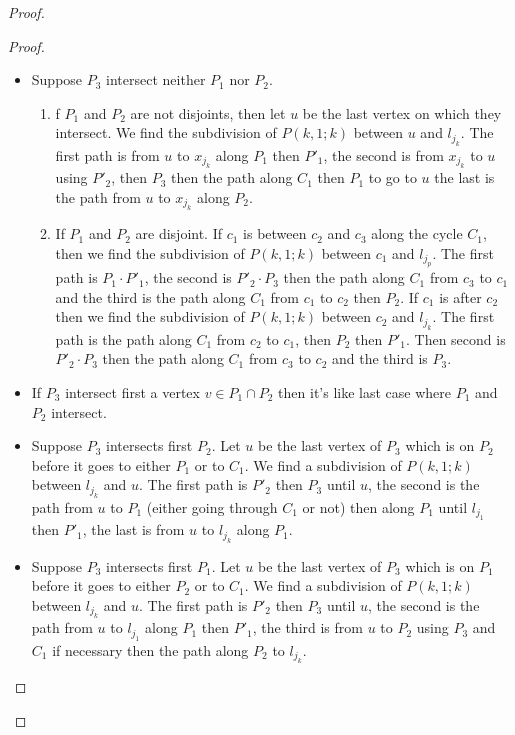 \documentclass[10pt]{article}
\theoremstyle{plain}
\theoremstyle{definition}
\theoremstyle{remark}
\begin{document}
\begin{proof}
\begin{proof}
\begin{itemize}
	\item Suppose $P_3$ intersect neither $P_1$ nor $P_2$.
	\begin{enumerate}
		\item f $P_1$ and $P_2 $ are not disjoints, 
		then let $u$ be the last vertex on which they intersect. We find the subdivision of $P(k,1;k)$ between $u$ and $l_{j_k}$. 
		The first path is from $u$ to $x_{j_k}$ along $P_1$ then $P'_1$, the second is from $x_{j_k}$ to $u$ using $P'_2$, then $P_3$ then the path along $C_1$ 
		then $P_1$ to go to $u$ the last is the path from $u$ to $x_{j_k}$ along $P_2$.
		\item 	If $P_1$ and $P_2$ are disjoint. If $c_1$ is between $c_2$ and $c_3$ along the cycle $C_1$, then we find the subdivision of $P(k,1;k)$
		between $c_1$ and $l_{j_p}$. The first path is $P_1 \cdot P'_1$, the second is $P'_2 \cdot P_3$ 
		then the path along $C_1$ from $c_3$ to $c_1$ and the third
	is the path along $C_1$ from $c_1$ to $c_2$ then $P_2$. If $c_1$ is after $c_2$ then we find the subdivision of $P(k,1;k)$ between $c_2$ and 
	$l_{j_k} $. The first path is the path along $C_1$ from $c_2$ to $c_1$, then $P_2$ then $P'_1$. Then second is $P'_2 \cdot P_3$ then the path along $C_1$ from
	$c_3$ to $c_2$ and the third is $P_3$. 
\end{enumerate}
	\item If $P_3$ intersect first a vertex $v \in P_1 \cap P_2$ then it's like last case where $P_1$ and $P_2$ intersect.
	\item Suppose $P_3$ intersects first $P_2$. Let $u$ be the last vertex of $P_3$ which is on $P_2$ before it goes to either $P_1$ or to $C_1$.
	We find a subdivision of $P(k,1;k)$ between $l_{j_k}$ and $u$. The first path is $P'_2$ then $P_3$ until $u$, the second is the path from $u$ to $P_1$ (either going
	through $C_1$ or not) then along $P_1$ until $l_{j_1}$ then $P'_1$, the last is from $u$ to $l_{j_k}$ along $P_1$.
	\item Suppose $P_3$ intersects first $P_1$. Let $u$ be the last vertex of $P_3$ which is on $P_1$ before it goes to either $P_2$ or to $C_1$.
	We find a subdivision of $P(k,1;k)$ between $l_{j_k}$ and $u$. The first path is $P'_2$ then $P_3$ until $u$, the second is the path from $u$ to
	$l_{j_1}$ along $P_1$ then $P'_1$, the third is from $u$ to $P_2$ using $P_3$ and $C_1$ if necessary then the path along $P_2$ to  $l_{j_k}$.
\end{itemize} 



\end{proof}
\end{proof}
\end{document}
